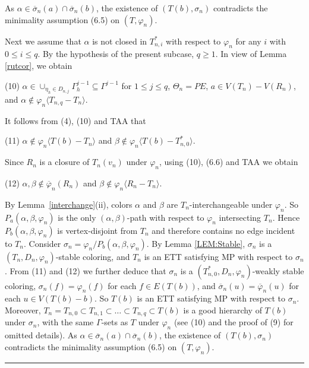 \documentclass[11pt]{article}
\newcommand{\phibar}{\overline{\varphi}}
\newcommand{\phiv}{\varphi}
\def\qed{\hfill \rule{4pt}{7pt}}
\begin{document}
As $\alpha\in\overline{\sigma}_n(a)\cap \overline{\sigma}_n(b)$, the existence of $(T(b), \sigma_n)$ contradicts the minimality assumption (6.5) on $(T, \varphi_n)$.  

Next we assume that $\alpha$ is not closed in $T^*_{n,i}$ with respect to $\varphi_n$ for any $i$ with $0\le i \le q$. By the hypothesis of the present
subcase, $q\geq 1$. In view of Lemma \ref{rutcor}, we obtain

(10) $\alpha\in \cup_{\eta_h\in D_{n,j}}\Gamma^{j-1}_h \subseteq \Gamma^{j-1}$ for $1 \le j \le q$,  $\Theta_n=PE$,  
$a \in V(T_n)-V(R_n)$, and $\alpha \notin \varphi_n \langle T_{n,q}- T_n \rangle$.  

It follows from (4), (10) and TAA that
 
(11) $\alpha\notin \phiv_n \langle T(b)-T_n \rangle$ and $\beta \notin \phiv_n \langle T(b)- T_{n,0}^* \rangle$. 

\noindent Since $R_n$ is a closure of $T_n(v_n)$ under $\varphi_n$, using (10), (6.6) and TAA we obtain 

(12) $\alpha, \beta \notin \overline{\varphi}_n (R_n)$ and $\beta \notin \varphi_n \langle R_n-T_n \rangle$.

By Lemma~\ref{interchange}(ii), colors $\alpha$ and $\beta$ are $T_n$-interchangeable under $\varphi_n$. So $P_{a}(\alpha,\beta,\varphi_n)$ is the only $(\alpha,\beta)$-path with respect to $\varphi_n$ intersecting 
$T_n$. Hence $P_{b}(\alpha,\beta,\varphi_n)$ is vertex-disjoint from $T_n$ and therefore contains no edge incident 
to  $T_n$.  Consider $\sigma_n=\varphi_n/P_{b}(\alpha,\beta,\varphi_n)$. By Lemma \ref{LEM:Stable}, 
$\sigma_n$ is a $(T_n, D_n,\varphi_n)$-stable coloring, and $T_n$ is an ETT satisfying MP with respect to $\sigma_n$.  
From (11) and (12) we further deduce that $\sigma_n$ is a $(T_{n,0}^*, D_n, \varphi_n)$-weakly stable coloring,
$\sigma_n(f)=\varphi_n(f)$ for each $f\in E(T(b))$, and $\overline{\sigma}_n(u)=\phibar_n(u)$ for each $u\in V(T(b)-b)$. 
So $T(b)$ is an ETT satisfying MP with respect to $\sigma_n$. Moreover, $T_n=T_{n,0} \subset T_{n,1}  \subset \ldots 
\subset T_{n,q} \subset T(b)$ is a good hierarchy of $T(b)$ under $\sigma_n$, with the same $\Gamma$-sets as $T$ 
under $\varphi_n$ (see (10) and the proof of (9) for omitted details). As $\alpha\in\overline{\sigma}_n(a)\cap \overline{\sigma}_n(b)$, the existence of $(T(b), \sigma_n)$ contradicts the minimality assumption (6.5) on 
$(T, \varphi_n)$.  \qed

\vskip 3mm
\end{document}

